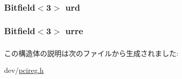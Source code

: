 \label{structPXCAP_a60eb67968c94996ae21364300df1b236}
\hypertarget{structPXCAP_a8e0e3f70b67ebf200891174583e18e97}{
\subsubsection[{urd}]{\setlength{\rightskip}{0pt plus 5cm}Bitfield$<$3$>$ {\bf urd}}}
\label{structPXCAP_a8e0e3f70b67ebf200891174583e18e97}
\hypertarget{structPXCAP_ab021ab93a2f4150f7a02c471dd3f3ae8}{
\subsubsection[{urre}]{\setlength{\rightskip}{0pt plus 5cm}Bitfield$<$3$>$ {\bf urre}}}
\label{structPXCAP_ab021ab93a2f4150f7a02c471dd3f3ae8}
\hypertarget{structPXCAP_aa7abc6e681b0a49c67b5227e08b0ea6b}{
\subsubsection[{ver}]{}}
\label{structPXCAP_aa7abc6e681b0a49c67b5227e08b0ea6b}


この構造体の説明は次のファイルから生成されました:\begin{DoxyCompactItemize}
\item 
dev/\hyperlink{pcireg_8h}{pcireg.h}\end{DoxyCompactItemize}
